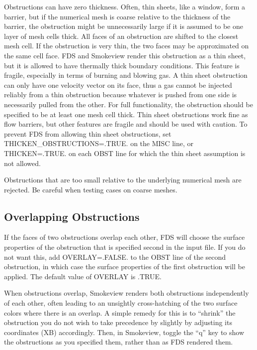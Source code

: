 \documentclass[11pt]{book}
\begin{document}
Obstructions can have zero thickness. Often, thin sheets, like a window, form a barrier, but if the numerical mesh is coarse relative to the thickness of the barrier, the obstruction might be unnecessarily large if it is assumed to be one layer of mesh cells thick. All faces of an obstruction are shifted to the closest mesh cell. If the obstruction is very thin, the two faces may be approximated on the same cell face. FDS and Smokeview render this obstruction as a thin sheet, but it is allowed to have thermally thick boundary conditions. This feature is fragile, especially in terms of burning and blowing gas. A thin sheet obstruction can only have one velocity vector on its face, thus a gas cannot be injected reliably from a thin obstruction because whatever is pushed from one side is necessarily pulled from the other. For full functionality, the obstruction should be specified to be at least one mesh cell thick. Thin sheet obstructions work fine as flow barriers, but other features are fragile and should be used with caution. To prevent FDS from allowing thin sheet obstructions, set {\ct THICKEN\_OBSTRUCTIONS=.TRUE.} on the {\ct MISC} line, or {\ct THICKEN=.TRUE.} on each {\ct OBST} line for which the thin sheet assumption is not allowed.

Obstructions that are too small relative to the underlying numerical mesh are rejected. Be careful when testing cases on coarse meshes.

\subsection{Overlapping Obstructions}

If the faces of two obstructions overlap each other, FDS will choose the surface properties of the obstruction that is specified second in the input file. If you do not want this, add {\ct OVERLAY=.FALSE.} to the {\ct OBST} line of the second obstruction, in which case the surface properties of the first obstruction will be applied. The default value of {\ct OVERLAY} is {\ct .TRUE.}

When obstructions overlap, Smokeview renders both obstructions independently of each other, often leading to an unsightly cross-hatching of the two surface colors where there is an overlap. A simple remedy for this is to ``shrink'' the obstruction you do not wish to take precedence by slightly by adjusting its coordinates ({\ct XB}) accordingly. Then, in Smokeview, toggle the ``q'' key to show the obstructions as you specified them, rather than as FDS rendered them.
\end{document}
